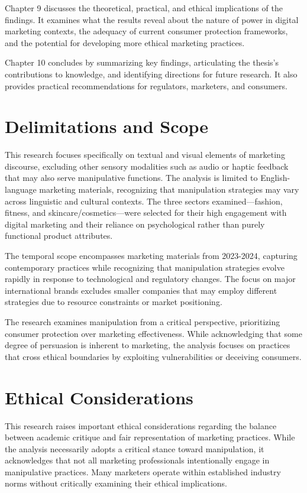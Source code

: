 Chapter 9 discusses the theoretical, practical, and ethical implications of the findings. It examines what the results reveal about the nature of power in digital marketing contexts, the adequacy of current consumer protection frameworks, and the potential for developing more ethical marketing practices.

Chapter 10 concludes by summarizing key findings, articulating the thesis's contributions to knowledge, and identifying directions for future research. It also provides practical recommendations for regulators, marketers, and consumers.

\section{Delimitations and Scope}
\label{sec:delimitations}

This research focuses specifically on textual and visual elements of marketing discourse, excluding other sensory modalities such as audio or haptic feedback that may also serve manipulative functions. The analysis is limited to English-language marketing materials, recognizing that manipulation strategies may vary across linguistic and cultural contexts. The three sectors examined—fashion, fitness, and skincare/cosmetics—were selected for their high engagement with digital marketing and their reliance on psychological rather than purely functional product attributes.

The temporal scope encompasses marketing materials from 2023-2024, capturing contemporary practices while recognizing that manipulation strategies evolve rapidly in response to technological and regulatory changes. The focus on major international brands excludes smaller companies that may employ different strategies due to resource constraints or market positioning.

The research examines manipulation from a critical perspective, prioritizing consumer protection over marketing effectiveness. While acknowledging that some degree of persuasion is inherent to marketing, the analysis focuses on practices that cross ethical boundaries by exploiting vulnerabilities or deceiving consumers.

\section{Ethical Considerations}
\label{sec:ethical_considerations}

This research raises important ethical considerations regarding the balance between academic critique and fair representation of marketing practices. While the analysis necessarily adopts a critical stance toward manipulation, it acknowledges that not all marketing professionals intentionally engage in manipulative practices. Many marketers operate within established industry norms without critically examining their ethical implications.

